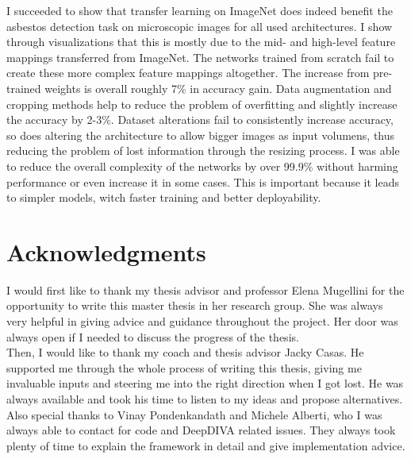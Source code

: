 \documentclass[11pt,a4paper,twoside,hidelinks,openright]{rvsmaster}
\begin{document}
\vspace{5mm} %

I succeeded to show that transfer learning on ImageNet does indeed benefit the asbestos detection task on microscopic images for all used architectures. I show through visualizations that this is mostly due to the mid- and high-level feature mappings transferred from ImageNet. The networks trained from scratch fail to create these more complex feature mappings altogether. The increase from pre-trained weights is overall roughly 7\% in accuracy gain. Data augmentation and cropping methods help to reduce the problem of overfitting and slightly increase the accuracy by 2-3\%. Dataset alterations fail to consistently increase accuracy, so does altering the architecture to allow bigger images as input volumens, thus reducing the problem of lost information through the resizing process. I was able to reduce the overall complexity of the networks by over 99.9\% without harming performance or even increase it in some cases. This is important because it leads to simpler models, witch faster training and better deployability.


\tableofcontents{}
\listoffigures{}
\listoftables{}



\chapter*{Acknowledgments}

I would first like to thank my thesis advisor and professor Elena Mugellini for the opportunity to write this master thesis in her research group. She was always very helpful in giving advice and guidance throughout the project. Her door was always open if I needed to discuss the progress of the thesis.\\


Then, I would like to thank my coach and thesis advisor Jacky Casas. He supported me through the whole process of writing this thesis, giving me invaluable inputs and steering me into the right direction when I got lost. He was always available and took his time to listen to my ideas and propose alternatives.\\


Also special thanks to Vinay Pondenkandath and Michele Alberti, who I was always able to contact for code and DeepDIVA related issues. They always took plenty of time to explain the framework in detail and give implementation advice.\\
\end{document}
